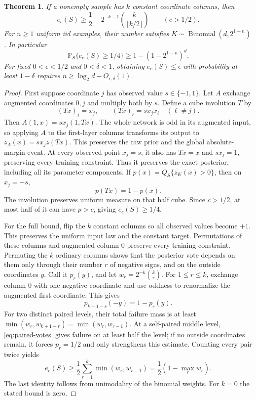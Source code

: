 \documentclass[11pt]{article}
\newtheorem{theorem}{Theorem}[section]
\theoremstyle{remark}\newtheorem{remark}[theorem]{Remark}
\newcommand{\Prb}{\mathbb P}
\begin{document}
\begin{theorem}\label{thm:symmetry}
If a nonempty sample has $k$ constant coordinate columns, then
\[
 e_c(S)\ge\frac12-2^{-k-1}\binom{k}{\lfloor k/2\rfloor}
 \qquad(c>1/2).
\]
For $n\ge1$ uniform iid examples, their number satisfies
$K\sim\operatorname{Binomial}(d,2^{1-n})$. In particular
\[
 \Prb_S\{e_c(S)\ge1/4\}\ge1-(1-2^{1-n})^d.
\]
For fixed $0<\epsilon<1/2$ and $0<\delta<1$, obtaining
$e_c(S)\le\epsilon$ with probability at least $1-\delta$ requires
$n\ge\log_2d-O_{\epsilon,\delta}(1)$.
\end{theorem}
\begin{proof}
First suppose coordinate $j$ has observed value $s\in\{-1,1\}$.
Let $A$ exchange augmented coordinates $0,j$ and multiply both by $s$.
Define a cube involution $T$ by
\[
 (Tx)_j=x_j,\qquad (Tx)_\ell=sx_jx_\ell\quad(\ell\ne j).
\]
Then $A(1,x)=sx_j(1,Tx)$. The whole network is odd in its augmented
input, so applying $A$ to the first-layer columns transforms its output
to $z_A(x)=sx_jz(Tx)$. This preserves the raw prior and the global
absolute-margin event. At every observed point $x_j=s$, it also has
$Tx=x$ and $sx_j=1$, preserving every training constraint.
Thus it preserves the exact posterior, including all its parameter
components. If $p(x)=Q_S\{z_W(x)>0\}$, then on $x_j=-s$,
\[
 p(Tx)=1-p(x).
\]
The involution preserves uniform measure on that half cube. Since
$c>1/2$, at most half of it can have $p>c$, giving $e_c(S)\ge1/4$.

For the full bound, flip the $k$ constant columns so all observed
values become $+1$. This preserves the uniform input law and the
constant target. Permutations of these columns and augmented column
$0$ preserve every training constraint. Permuting the $k$ ordinary
columns shows that the posterior vote depends on them only through
their number $r$ of negative signs, and on the outside coordinates
$y$. Call it $p_r(y)$, and let $w_r=2^{-k}\binom kr$.
For $1\le r\le k$, exchange column $0$ with one negative coordinate
and use oddness to renormalize the augmented first coordinate. This gives
\begin{equation}\label{eq:paired-votes}
 p_{k+1-r}(-y)=1-p_r(y).
\end{equation}
For two distinct paired levels, their total failure mass is at least
$\min(w_r,w_{k+1-r})=\min(w_r,w_{r-1})$. At a self-paired middle
level, \eqref{eq:paired-votes} gives failure on at least half the
level; if no outside coordinates remain, it forces $p_r=1/2$ and
only strengthens this estimate. Counting every pair twice yields
\[
 e_c(S)\ge\frac12\sum_{r=1}^k\min(w_r,w_{r-1})
         =\frac12(1-\max_r w_r).
\]
The last identity follows from unimodality of the binomial weights.
For $k=0$ the stated bound is zero.


\end{proof}
\end{document}
